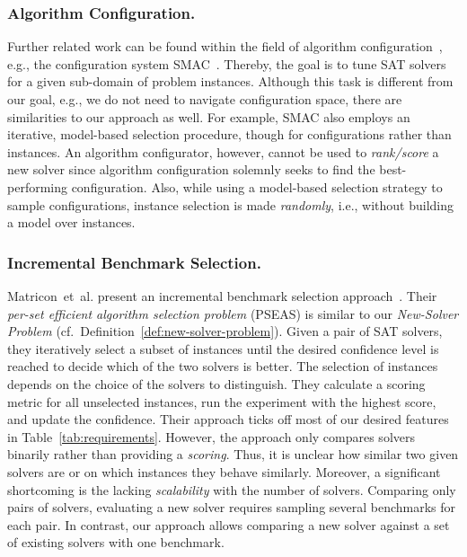 \documentclass[runningheads]{llncs}
\begin{document}
\subsubsection{Algorithm Configuration.}

Further related work can be found within the field of algorithm configuration~\cite{HoosHL21,Stutzle0P22}, e.g., the configuration system SMAC~\cite{HutterHL11}.
Thereby, the goal is to tune SAT solvers for a given sub-domain of problem instances.
Although this task is different from our goal, e.g., we do not need to navigate configuration space, there are similarities to our approach as well.
For example, SMAC also employs an iterative, model-based selection procedure, though for configurations rather than instances.
An algorithm configurator, however, cannot be used to \emph{rank/score} a new solver since algorithm configuration solemnly seeks to find the best-performing configuration.
Also, while using a model-based selection strategy to sample configurations, instance selection is made \emph{randomly}, i.e., without building a model over instances.

\subsubsection{Incremental Benchmark Selection.}

Matricon~et~al. present an incremental benchmark selection approach~\cite{MatriconAFSH21}.
Their \emph{per-set efficient algorithm selection problem} (PSEAS) is similar to our \emph{New-Solver Problem} (cf.~Definition~\ref{def:new-solver-problem}).
Given a pair of SAT solvers, they iteratively select a subset of instances until the desired confidence level is reached to decide which of the two solvers is better.
The selection of instances depends on the choice of the solvers to distinguish.
They calculate a scoring metric for all unselected instances, run the experiment with the highest score, and update the confidence.
Their approach ticks off most of our desired features in Table~\ref{tab:requirements}.
However, the approach only compares solvers binarily rather than providing a \emph{scoring}.
Thus, it is unclear how similar two given solvers are or on which instances they behave similarly.
Moreover, a significant shortcoming is the lacking \emph{scalability} with the number of solvers.
Comparing only pairs of solvers, evaluating a new solver requires sampling several benchmarks for each pair.
In contrast, our approach allows comparing a new solver against a set of existing solvers with one benchmark.
\end{document}
